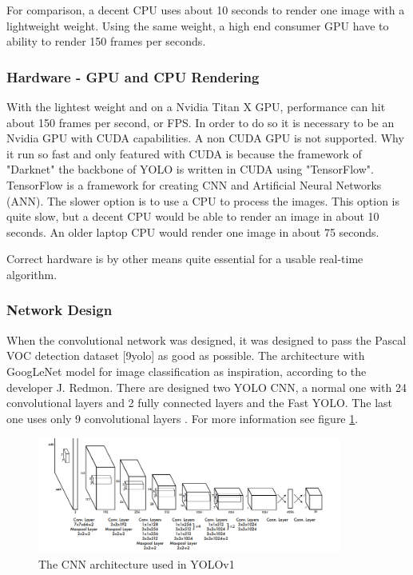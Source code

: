 For comparison, a decent CPU uses about 10 seconds to render one image with a lightweight weight. Using the same weight, a high end consumer GPU have to ability to render 150 frames per seconds. 
\subsubsection*{Hardware - GPU and CPU Rendering}
With the lightest weight and on a Nvidia Titan X GPU, performance can hit about 150 frames per second, or FPS. In order to do so it is necessary to be an Nvidia GPU with CUDA capabilities. A non CUDA GPU is not supported. Why it run so fast and only featured with CUDA is because the framework of "Darknet" the backbone of YOLO is written in CUDA using "TensorFlow". TensorFlow is a framework for creating CNN and Artificial Neural Networks (ANN). The slower option is to use a CPU to process the images. This option is quite slow, but a decent CPU would be able to render an image in about 10 seconds. An older laptop CPU would render one image in about 75 seconds. 

Correct hardware is by other means quite essential for a usable real-time algorithm. 
\subsubsection*{Network Design}
When the convolutional network was designed, it was designed to pass the Pascal VOC detection dataset [9yolo] as good as possible. The architecture with GoogLeNet model for image classification as inspiration, according to the developer J. Redmon. There are designed two YOLO CNN, a normal one with 24 convolutional layers and 2 fully connected layers and the Fast YOLO. The last one uses only 9 convolutional layers \cite{YOLO}. For more information see figure \ref{fig:yolo_Convnet}.

\begin{figure}
    \centering
        \includegraphics[width=10cm]{img/yolo_CONVnet.png}
    \caption{The CNN architecture used in YOLOv1 \cite{YOLO} }
    \label{fig:yolo_Convnet}
\end{figure}

